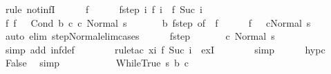 \begin{isabellebody}
\ {\isacharparenleft}rule\ not{\isacharunderscore}infI{\isacharparenright}\isanewline
\ \ \ \ \isamarkupfalse%
\ f\isanewline
\ \ \ \ \isamarkupfalse%
\ f{\isacharunderscore}step{\isacharcolon}\ {\isachardoublequoteopen}{\isasymAnd}i{\isachardot}\ {\isasymGamma}{\isasymturnstile}f\ i\ {\isasymrightarrow}\ f\ {\isacharparenleft}Suc\ i{\isacharparenright}{\isachardoublequoteclose}\isanewline
\ \ \ \ \isamarkupfalse%
\ f{\isacharunderscore}{}{\isacharcolon}\ {\isachardoublequoteopen}f\ {}\ {\isacharequal}\ {\isacharparenleft}Cond\ b\ c{}\ c{}{\isacharcomma}\ Normal\ s{\isacharparenright}{\isachardoublequoteclose}\ \isanewline
\ \ \ \ \isamarkupfalse%
\ b\ f{\isacharunderscore}step\ {\isacharbrackleft}of\ {}{\isacharbrackright}\ f{\isacharunderscore}{}\isanewline
\ \ \ \ \isamarkupfalse%
\ {\isachardoublequoteopen}f\ {}\ {\isacharequal}\ {\isacharparenleft}c{}{\isacharcomma}Normal\ s{\isacharparenright}{\isachardoublequoteclose}\isanewline
\ \ \ \ \ \ \isamarkupfalse%
\ {\isacharparenleft}auto\ elim{\isacharcolon}\ step{\isacharunderscore}Normal{\isacharunderscore}elim{\isacharunderscore}cases{\isacharparenright}\isanewline
\ \ \ \ \isamarkupfalse%
\ f{\isacharunderscore}step\isanewline
\ \ \ \ \isamarkupfalse%
\ {\isachardoublequoteopen}{\isasymGamma}{\isasymturnstile}\ {\isacharparenleft}c{}{\isacharcomma}\ Normal\ s{\isacharparenright}\ {\isasymrightarrow}\ {\isasymdots}{\isacharparenleft}{\isasyminfinity}{\isacharparenright}{\isachardoublequoteclose}\isanewline
\ \ \ \ \ \ \isamarkupfalse%
\ {\isacharparenleft}simp\ add{\isacharcolon}\ inf{\isacharunderscore}def{\isacharparenright}\isanewline
\ \ \ \ \ \ \isamarkupfalse%
\ {\isacharparenleft}rule{\isacharunderscore}tac\ x{\isacharequal}{\isachardoublequoteopen}{\isasymlambda}i{\isachardot}\ f\ {\isacharparenleft}Suc\ i{\isacharparenright}{\isachardoublequoteclose}\ \ exI{\isacharparenright}\isanewline
\ \ \ \ \ \ \isamarkupfalse%
\ simp\isanewline
\ \ \ \ \isamarkupfalse%
\ hyp{\isacharunderscore}c{}\ \isamarkupfalse%
\ False\ \isamarkupfalse%
\ simp\isanewline
\ \ \isamarkupfalse%
\isanewline
{}\isamarkupfalse%
\ \ \ \ \isanewline
\ \ \isamarkupfalse%
\ {\isacharparenleft}WhileTrue\ s\ b\ c{\isacharparenright}\isanewline

\end{isabellebody}
